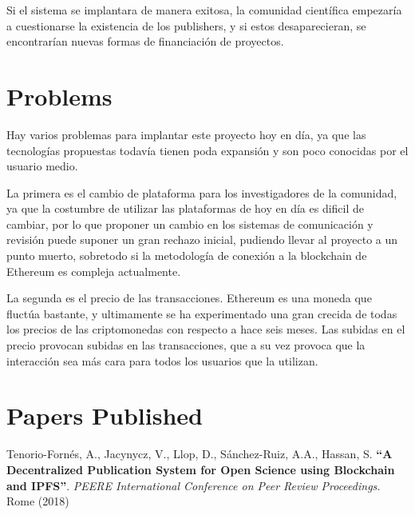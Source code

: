 Si el sistema se implantara de manera exitosa, la comunidad científica empezaría
a cuestionarse la existencia de los publishers, y si estos desaparecieran, se
encontrarían nuevas formas de financiación de proyectos.

\section{Problems}


Hay varios problemas para implantar este proyecto hoy en día, ya que las
tecnologías propuestas todavía tienen poda expansión y son poco conocidas por el
usuario medio.

La primera es el cambio de plataforma para los investigadores de la comunidad,
ya que la costumbre de utilizar las plataformas de hoy en día es dificil de
cambiar, por lo que proponer un cambio en los sistemas de comunicación y
revisión puede suponer un gran rechazo inicial, pudiendo llevar al proyecto a un
punto muerto, sobretodo si la metodología de conexión a la blockchain de
Ethereum es compleja actualmente.

La segunda es el precio de las transacciones. Ethereum es una moneda que fluctúa
bastante, y ultimamente se ha experimentado una gran crecida de todas los
precios de las criptomonedas con respecto a hace seis meses. Las subidas en el
precio provocan subidas en las transacciones, que a su vez provoca que la
interacción sea más cara para todos los usuarios que la utilizan.

\section{Papers Published}
Tenorio-Fornés, A., Jacynycz, V., Llop, D., Sánchez-Ruiz, A.A., Hassan, S.
\textbf{“A Decentralized Publication System for Open Science using Blockchain
  and IPFS”}. \emph{PEERE International Conference on Peer Review Proceedings.}
Rome (2018)


